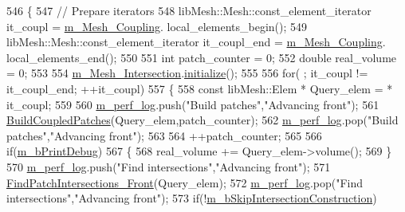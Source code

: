 \begin{DoxyCode}
546     \{
547         \textcolor{comment}{// Prepare iterators}
548         libMesh::Mesh::const\_element\_iterator it\_coupl = \hyperlink{classcarl_1_1_intersection___search_adb13a40afa6c1f8db7bb33f68c5b42d2}{m\_Mesh\_Coupling}.
      local\_elements\_begin();
549         libMesh::Mesh::const\_element\_iterator it\_coupl\_end = \hyperlink{classcarl_1_1_intersection___search_adb13a40afa6c1f8db7bb33f68c5b42d2}{m\_Mesh\_Coupling}.
      local\_elements\_end();
550 
551         \textcolor{keywordtype}{int} patch\_counter = 0;
552         \textcolor{keywordtype}{double} real\_volume = 0;
553 
554         \hyperlink{classcarl_1_1_intersection___search_a4946b764d66e3f26f323c5d043551c66}{m\_Mesh\_Intersection}.\hyperlink{classcarl_1_1_mesh___intersection_a195605fd295d5afc638129309103f576}{initialize}();
555 
556         \textcolor{keywordflow}{for}( ; it\_coupl != it\_coupl\_end; ++it\_coupl)
557         \{
558             \textcolor{keyword}{const} libMesh::Elem * Query\_elem = * it\_coupl;
559 
560             \hyperlink{classcarl_1_1_intersection___search_aebe6210287a36909206b1a59f9cd17e0}{m\_perf\_log}.push(\textcolor{stringliteral}{"Build patches"},\textcolor{stringliteral}{"Advancing front"});
561             \hyperlink{classcarl_1_1_intersection___search_a00e012de151310737c771ee7b15c9b2c}{BuildCoupledPatches}(Query\_elem,patch\_counter);
562             \hyperlink{classcarl_1_1_intersection___search_aebe6210287a36909206b1a59f9cd17e0}{m\_perf\_log}.pop(\textcolor{stringliteral}{"Build patches"},\textcolor{stringliteral}{"Advancing front"});
563 
564             ++patch\_counter;
565 
566             \textcolor{keywordflow}{if}(\hyperlink{classcarl_1_1_intersection___search_af69485e014f8178ec6c6dcbd95bf9dc9}{m\_bPrintDebug})
567             \{
568                 real\_volume += Query\_elem->volume();
569             \}
570             \hyperlink{classcarl_1_1_intersection___search_aebe6210287a36909206b1a59f9cd17e0}{m\_perf\_log}.push(\textcolor{stringliteral}{"Find intersections"},\textcolor{stringliteral}{"Advancing front"});
571             \hyperlink{classcarl_1_1_intersection___search_ad3ea665115367f2a90183e581d9d2d70}{FindPatchIntersections\_Front}(Query\_elem);
572             \hyperlink{classcarl_1_1_intersection___search_aebe6210287a36909206b1a59f9cd17e0}{m\_perf\_log}.pop(\textcolor{stringliteral}{"Find intersections"},\textcolor{stringliteral}{"Advancing front"});
573             \textcolor{keywordflow}{if}(!\hyperlink{classcarl_1_1_intersection___search_aef626956ac007f4c737aba3f2f69f2de}{m\_bSkipIntersectionConstruction})

\end{DoxyCode}
